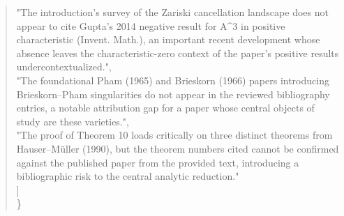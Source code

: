 \documentclass[11pt]{article}
\begin{document}
\begin{quote}
    "The introduction's survey of the Zariski cancellation landscape does not appear to cite Gupta's 2014 negative result for A\^{}3 in positive characteristic (Invent. Math.), an important recent development whose absence leaves the characteristic-zero context of the paper's positive results undercontextualized.",\\
    "The foundational Pham (1965) and Brieskorn (1966) papers introducing Brieskorn--Pham singularities do not appear in the reviewed bibliography entries, a notable attribution gap for a paper whose central objects of study are these varieties.",\\
    "The proof of Theorem 10 loads critically on three distinct theorems from Hauser--Müller (1990), but the theorem numbers cited cannot be confirmed against the published paper from the provided text, introducing a bibliographic risk to the central analytic reduction."\\
  ]\\
\}\\
\end{quote}
\end{document}
